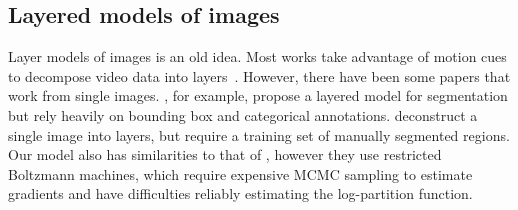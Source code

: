 
\vspace{-2mm}
\subsection{Layered models of images}\vspace{-2mm}

Layer models of images is an old idea.
Most works 
take advantage of motion cues to decompose video data into layers~\citep{wang1994representing,ayer1995layered,kannan2005generative}.
However, there have been some papers that work from single images.
\cite{yang2012layered}, for example, propose a layered model for
segmentation but rely heavily on bounding box and categorical
annotations.	
\cite{Isola2013} deconstruct a single image into layers, but require a
training set of manually segmented regions.
Our model also has similarities to that of \cite{le2011learning}, however  they use restricted Boltzmann machines, 
which require expensive MCMC sampling to estimate gradients and have difficulties reliably estimating the 
log-partition function.  
\vspace{-2mm}
	
	
	


	
	
	
		
	
	
	
	
	
	
	
